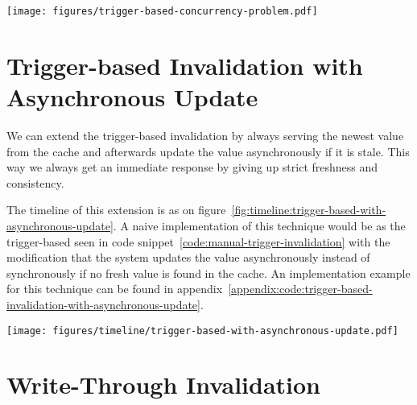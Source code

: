 \begin{figure*}[ht!]
  \centering
  \texttt{[image: figures/trigger-based-concurrency-problem.pdf]}
  \caption{A scenario of the trigger-based invalidation that results in a race condition, where the cached value are being incorrectly marked as valid even though it is storing a stale value.}
  \label{fig:trigger-based-concurrency-problem}
\end{figure*}


\section{Trigger-based Invalidation with Asynchronous Update}
\label{subsec:trigger-based-invalidation-with-asynchronous-update}

We can extend the trigger-based invalidation by always serving the newest value from the cache and afterwards update the value asynchronously if it is stale. This way we always get an immediate response by giving up strict freshness and consistency.

The timeline of this extension is as on figure~\ref{fig:timeline:trigger-based-with-asynchronous-update}. A naive implementation of this technique would be as the trigger-based seen in code snippet~\ref{code:manual-trigger-invalidation} with the modification that the system updates the value asynchronously instead of synchronously if no fresh value is found in the cache. An implementation example for this technique can be found in appendix~\ref{appendix:code:trigger-based-invalidation-with-asynchronous-update}.

\begin{figure*}[ht!]
  \centering
  \texttt{[image: figures/timeline/trigger-based-with-asynchronous-update.pdf]}
  \caption{The lifecycle of the \emph{trigger-based invalidation} technique where the value is updated in the asynchronous}
  \label{fig:timeline:trigger-based-with-asynchronous-update}
\end{figure*}


\section{Write-Through Invalidation}
\label{subsec:write_through_invalidation}

